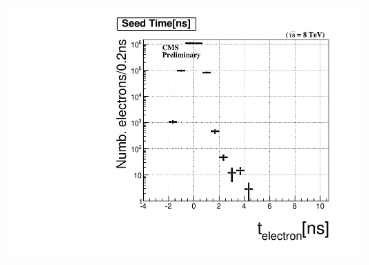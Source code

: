 \vspace{5mm}
\begin{minipage}{0.90\linewidth} 
\begin{center}
\includegraphics[height=0.55\textwidth, width=0.7\textwidth]{THESISPLOTS/Seed-Time-From-Uncleaned-di-photon-Mass-Fit-DoubleElectron-Run2012A.pdf}
\label{fig:Ztime}
\end{center}
\end{minipage}



